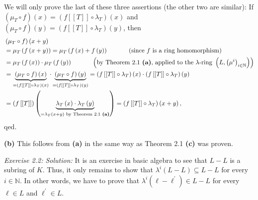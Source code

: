 \documentclass[numbers=enddot,12pt,final,onecolumn,notitlepage]{scrartcl}%
\begin{document}
We will only prove the last of these three assertions (the other two are
similar): If $\left(  \mu_{T}\circ f\right)  \left(  x\right)  =\left(
f\left[  \left[  T\right]  \right]  \circ\lambda_{T}\right)  \left(  x\right)
$ and $\left(  \mu_{T}\circ f\right)  \left(  y\right)  =\left(  f\left[
\left[  T\right]  \right]  \circ\lambda_{T}\right)  \left(  y\right)  $, then%
\begin{align*}
&  \left(  \mu_{T}\circ f\right)  \left(  x+y\right) \\
&  =\mu_{T}\left(  f\left(  x+y\right)  \right)  =\mu_{T}\left(  f\left(
x\right)  +f\left(  y\right)  \right)  \ \ \ \ \ \ \ \ \ \ \left(  \text{since
}f\text{ is a ring homomorphism}\right) \\
&  =\mu_{T}\left(  f\left(  x\right)  \right)  \cdot\mu_{T}\left(  f\left(
y\right)  \right)  \ \ \ \ \ \ \ \ \ \ \left(  \text{by Theorem 2.1
\textbf{(a)}, applied to the }\lambda\text{-ring }\left(  L,\left(  \mu
^{i}\right)  _{i\in\mathbb{N}}\right)  \right) \\
&  =\underbrace{\left(  \mu_{T}\circ f\right)  \left(  x\right)  }_{=\left(
f\left[  \left[  T\right]  \right]  \circ\lambda_{T}\right)  \left(  x\right)
}\cdot\underbrace{\left(  \mu_{T}\circ f\right)  \left(  y\right)  }_{=\left(
f\left[  \left[  T\right]  \right]  \circ\lambda_{T}\right)  \left(  y\right)
}=\left(  f\left[  \left[  T\right]  \right]  \circ\lambda_{T}\right)  \left(
x\right)  \cdot\left(  f\left[  \left[  T\right]  \right]  \circ\lambda
_{T}\right)  \left(  y\right) \\
&  =\left(  f\left[  \left[  T\right]  \right]  \right)  \left(
\underbrace{\lambda_{T}\left(  x\right)  \cdot\lambda_{T}\left(  y\right)
}_{=\lambda_{T}\left(  x+y\right)  \text{ by Theorem 2.1 \textbf{(a)}}%
}\right)  =\left(  f\left[  \left[  T\right]  \right]  \circ\lambda
_{T}\right)  \left(  x+y\right)  ,
\end{align*}
qed.

\textbf{(b)} This follows from \textbf{(a)} in the same way as Theorem 2.1
\textbf{(c)} was proven.

\textit{Exercise 2.2: Solution:} It is an exercise in basic algebra to see
that $L-L$ is a subring of $K$. Thus, it only remains to show that
$\lambda^{i}\left(  L-L\right)  \subseteq L-L$ for every $i\in\mathbb{N}$. In
other words, we have to prove that $\lambda^{i}\left(  \ell-\ell^{\prime
}\right)  \in L-L$ for every $\ell\in L$ and $\ell^{\prime}\in L$.
\end{document}
